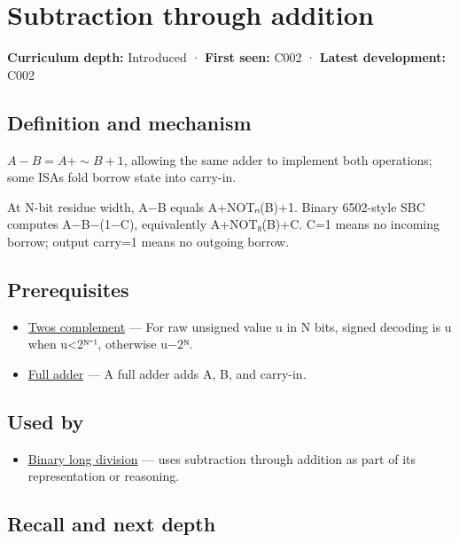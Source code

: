 \hypertarget{appendix-1c7df340573e}{}\label{referencestart:appendix-1c7df340573e}
\section{Subtraction through addition}\label{appendix-1c7df340573e-subtraction-through-addition}

\textbf{Curriculum depth:} Introduced · \textbf{First seen:} C002 · \textbf{Latest development:} C002

\subsection{Definition and mechanism}\label{appendix-1c7df340573e-definition-and-mechanism}

\(A-B=A+\sim B+1\), allowing the same adder to implement both operations; some ISAs fold borrow state into carry-in.

At N-bit residue width, A−B equals A+NOTₙ(B)+1. Binary 6502-style SBC computes A−B−(1−C), equivalently A+NOT₈(B)+C. C=1 means no incoming borrow; output carry=1 means no outgoing borrow.

\subsection{Prerequisites}\label{appendix-1c7df340573e-prerequisites}

\begin{itemize}
\tightlist
\item
  \hyperref[appendix-4fbc03d20829]{Two\textquotesingle s complement} --- For raw unsigned value u in N bits, signed decoding is u when u\textless2ᴺ⁻¹, otherwise u−2ᴺ.
\item
  \hyperref[appendix-d1a5b1e520c2]{Full adder} --- A full adder adds A, B, and carry-in.
\end{itemize}

\subsection{Used by}\label{appendix-1c7df340573e-used-by}

\begin{itemize}
\tightlist
\item
  \hyperref[appendix-89985e6a2685]{Binary long division} --- uses subtraction through addition as part of its representation or reasoning.
\end{itemize}

\subsection{Recall and next depth}\label{appendix-1c7df340573e-recall-and-next-depth}

